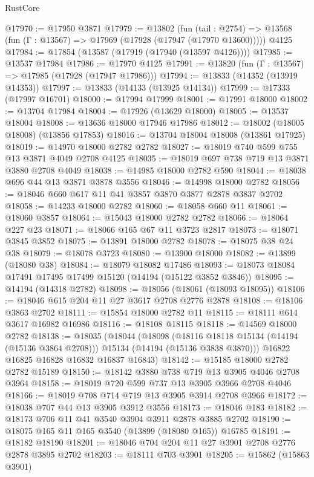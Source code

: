 \begin{lexlean}{RustCore}
\begin{coremodule}
@17970 := @17950 @3871
@17979 := @13802
    (fun (tail : @2754) => @13568 (fun (Γ : @13567) => @17969 (@17928 (@17947 (@17970 @13600)))))
    @4125
@17984 := @17854 (@13587 (@17919 (@17940 (@13597 @4126))))
@17985 := @13537 @17984
@17986 := @17970 @4125
@17991 := @13820 (fun (Γ : @13567) => @17985 (@17928 (@17947 @17986)))
@17994 := @13833 (@14352 (@13919 @14353))
@17997 := @13833 (@14133 (@13925 @14134))
@17999 := @17333 (@17997 @16701)
@18000 := @17994 @17999
@18001 := @17991 @18000
@18002 := @13704 @17984
@18004 := @17926 (@13629 @18000)
@18005 := @13537 @18004
@18008 := @13636 @18000 @17946 @17986
@18012 := @18002 (@18005 @18008) (@13856 @17853)
@18016 := @13704 @18004 @18008 (@13861 @17925)
@18019 := @14970 @18000 @2782 @2782
@18027 := @18019 @740 @599 @755 @13 @3871 @4049 @2708 @4125
@18035 := @18019 @697 @738 @719 @13 @3871 @3880 @2708 @4049
@18038 := @14985 @18000 @2782 @590
@18044 := @18038 @696 @44 @13 @3871 @3878 @3556
@18046 := @14998 @18000 @2782
@18056 := @18046 @660 @617 @11 @41 @3857 @3870 @3877 @2878 @3837 @2702
@18058 := @14233 @18000 @2782
@18060 := @18058 @660 @11
@18061 := @18060 @3857
@18064 := @15043 @18000 @2782 @2782
@18066 := @18064 @227 @23
@18071 := @18066 @165 @67 @11 @3723 @2817
@18073 := @18071 @3845 @3852
@18075 := @13891 @18000 @2782
@18078 := @18075 @38 @24 @38
@18079 := @18078 @3723
@18080 := @13900 @18000
@18082 := @13899 (@18080 @38)
@18084 := @18079 @18082 @17486
@18093 := @18073 @18084 @17491 @17495 @17499 @15120 (@14194 (@15122 @3852 @3846))
@18095 := @14194 (@14318 @2782)
@18098 := @18056 (@18061 (@18093 @18095))
@18106 := @18046 @615 @204 @11 @27 @3617 @2708 @2776 @2878
@18108 := @18106 @3863 @2702
@18111 := @15854 @18000 @2782 @11
@18115 := @18111 @614 @3617 @16982 @16986
@18116 := @18108 @18115
@18118 := @14569 @18000 @2782
@18138 := @18035
    (@18044
      (@18098
        (@18116 @18118 @15134 (@14194 (@15136 @3864 @2708)))
        @15134
        (@14194 (@15136 @3838 @3870)))
      @16822
      @16825
      @16828
      @16832
      @16837
      @16843)
@18142 := @15185 @18000 @2782 @2782 @15189
@18150 := @18142 @3880 @738 @719 @13 @3905 @4046 @2708 @3964
@18158 := @18019 @720 @599 @737 @13 @3905 @3966 @2708 @4046
@18166 := @18019 @708 @714 @719 @13 @3905 @3914 @2708 @3966
@18172 := @18038 @707 @44 @13 @3905 @3912 @3556
@18173 := @18046 @183
@18182 := @18173 @706 @11 @41 @3540 @3904 @3911 @2878 @3885 @2702
@18190 := @18075 @165 @11 @165 @3540 (@13899 (@18080 @165)) @16785
@18191 := @18182 @18190
@18201 := @18046 @704 @204 @11 @27 @3901 @2708 @2776 @2878 @3895 @2702
@18203 := @18111 @703 @3901
@18205 := @15862 (@15863 @3901)

\end{coremodule}
\end{lexlean}
